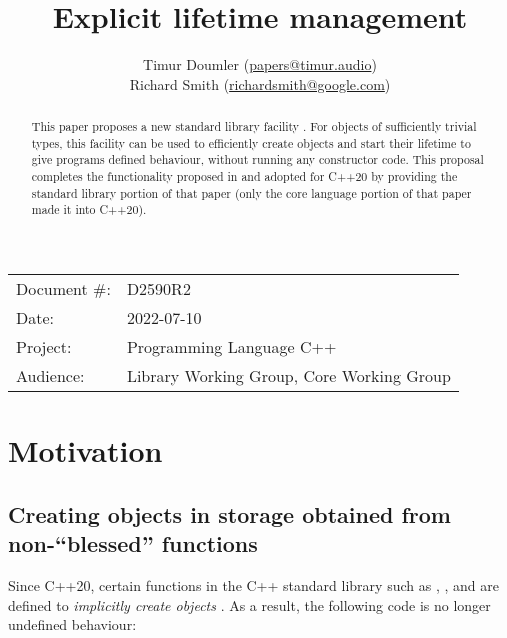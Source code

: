

\newcommand{\forceindent}{\parindent=1em\indent\parindent=0pt\relax} %


\title{Explicit lifetime management}
\author{
  Timur Doumler \small(\href{mailto:papers@timur.audio}{papers@timur.audio}) \\
  Richard Smith \small(\href{mailto:richardsmith@google.com}{richardsmith@google.com})
}
\date{}
\maketitle

\begin{tabular}{ll}
Document \#: & D2590R2 \\
Date: & 2022-07-10\\
Project: & Programming Language C++ \\
Audience: & Library Working Group, Core Working Group
\end{tabular}


\begin{abstract}
This paper proposes a new standard library facility . For objects of sufficiently trivial types, this facility can be used to efficiently create objects and start their lifetime to give programs defined behaviour, without running any constructor code. This proposal completes the functionality  proposed in \cite{P0593R6} and adopted for C++20 by providing the standard library portion of that paper (only the core language portion of that paper made it into C++20).
\end{abstract}

\section{Motivation}
\label{sec:motivation}

\subsection{Creating objects in storage obtained from non-``blessed'' functions}

Since C++20, certain functions in the C++ standard library such as , , and  are defined to \emph{implicitly create objects} \cite{P0593R6}. As a result, the following code is no longer undefined behaviour:

